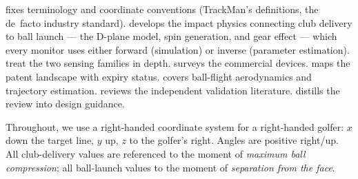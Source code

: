  fixes terminology and coordinate conventions
(TrackMan's definitions, the de~facto industry standard).
 develops the impact physics connecting club delivery to
ball launch --- the D-plane model, spin generation, and gear effect --- which
every monitor uses either forward (simulation) or inverse (parameter
estimation).  treat the two sensing families in
depth.  surveys the commercial devices.
 maps the patent landscape with expiry status.
 covers ball-flight aerodynamics and trajectory estimation.
 reviews the independent validation literature.
 distills the review into design guidance.

\begin{keypoint}
Throughout, we use a right-handed coordinate system for a right-handed
golfer: $x$ down the target line, $y$ up, $z$ to the golfer's right.
Angles are positive right/up. All club-delivery values are referenced to
the moment of \emph{maximum ball compression}; all ball-launch values to
the moment of \emph{separation from the face}.
\end{keypoint}

